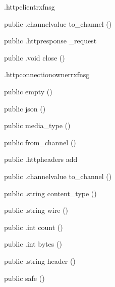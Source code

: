 \begin{CrexxClass}{.httpclient}{rxfnsg}
\begin{Members}
    \Method
      {public}
      {.channelvalue}
      {to\_channel}
      {()}

    \Method
      {public}
      {.httpresponse}
      {\_request}
      {}

    \Method
      {public}
      {.void}
      {close}
      {()}

  \end{Members}
\end{CrexxClass}

\begin{CrexxClass}{.httpconnectionowner}{rxfnsg}

  \begin{Hierarchy}
  \end{Hierarchy}

  \begin{Members}

    \Factory
      {public}
      {empty}
      {()}

    \Factory
      {public}
      {json}
      {()}

    \Factory
      {public}
      {media\_type}
      {()}

    \Factory
      {public}
      {from\_channel}
      {()}

    \Method
      {public}
      {.httpheaders}
      {add}
      {}

    \Method
      {public}
      {.channelvalue}
      {to\_channel}
      {()}

    \Method
      {public}
      {.string}
      {content\_type}
      {()}

    \Method
      {public}
      {.string}
      {wire}
      {()}

    \Method
      {public}
      {.int}
      {count}
      {()}

    \Method
      {public}
      {.int}
      {bytes}
      {()}

    \Method
      {public}
      {.string}
      {header}
      {()}

    \Factory
      {public}
      {safe}
      {()}


\end{Members}
\end{CrexxClass}
